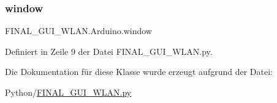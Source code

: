 \subsubsection{\texorpdfstring{window}{window}}
{\footnotesize\ttfamily F\+I\+N\+A\+L\+\_\+\+G\+U\+I\+\_\+\+W\+L\+A\+N.\+Arduino.\+window}



Definiert in Zeile 9 der Datei F\+I\+N\+A\+L\+\_\+\+G\+U\+I\+\_\+\+W\+L\+A\+N.\+py.



Die Dokumentation für diese Klasse wurde erzeugt aufgrund der Datei\+:\begin{DoxyCompactItemize}
\item 
Python/\hyperlink{_f_i_n_a_l___g_u_i___w_l_a_n_8py}{F\+I\+N\+A\+L\+\_\+\+G\+U\+I\+\_\+\+W\+L\+A\+N.\+py}\end{DoxyCompactItemize}
